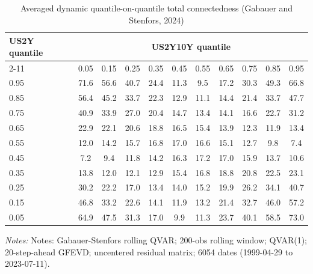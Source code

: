 \begin{table}[htbp]\centering
\caption{Averaged dynamic quantile-on-quantile total connectedness (Gabauer and Stenfors, 2024)}\label{tab:qqconn}
\small
\begin{tabular}{lcccccccccc}
\toprule
US2Y quantile & \multicolumn{10}{c}{US2Y10Y quantile} \\
\cmidrule(lr){2-11}
 & 0.05 & 0.15 & 0.25 & 0.35 & 0.45 & 0.55 & 0.65 & 0.75 & 0.85 & 0.95 \\
\midrule
0.95 & 71.6 & 56.6 & 40.7 & 24.4 & 11.3 & 9.5 & 17.2 & 30.3 & 49.3 & 66.8 \\
0.85 & 56.4 & 45.2 & 33.7 & 22.3 & 12.9 & 11.1 & 14.4 & 21.4 & 33.7 & 47.7 \\
0.75 & 40.9 & 33.9 & 27.0 & 20.4 & 14.7 & 13.4 & 14.1 & 16.6 & 22.7 & 31.2 \\
0.65 & 22.9 & 22.1 & 20.6 & 18.8 & 16.5 & 15.4 & 13.9 & 12.3 & 11.9 & 13.4 \\
0.55 & 12.0 & 14.2 & 15.7 & 16.8 & 17.0 & 16.6 & 15.1 & 12.7 & 9.8 & 7.4 \\
0.45 & 7.2 & 9.4 & 11.8 & 14.2 & 16.3 & 17.2 & 17.0 & 15.9 & 13.7 & 10.6 \\
0.35 & 13.8 & 12.0 & 12.1 & 12.9 & 15.4 & 16.8 & 18.8 & 20.8 & 22.5 & 23.1 \\
0.25 & 30.2 & 22.2 & 17.0 & 13.4 & 14.0 & 15.2 & 19.9 & 26.2 & 34.1 & 40.7 \\
0.15 & 46.8 & 33.2 & 22.6 & 14.1 & 11.9 & 13.2 & 21.4 & 32.7 & 46.0 & 57.2 \\
0.05 & 64.9 & 47.5 & 31.3 & 17.0 & 9.9 & 11.3 & 23.7 & 40.1 & 58.5 & 73.0 \\
\bottomrule
\end{tabular}
\par\smallskip\begin{minipage}{0.95\linewidth}\footnotesize\textit{Notes:} Notes: Gabauer-Stenfors rolling QVAR; 200-obs rolling window; QVAR(1); 20-step-ahead GFEVD; uncentered residual matrix; 6054 dates (1999-04-29 to 2023-07-11).\end{minipage}
\end{table}